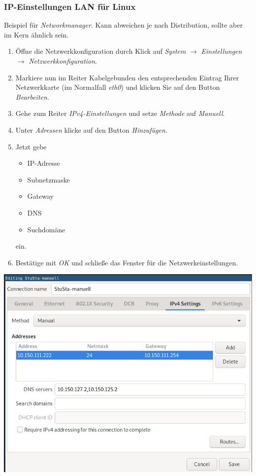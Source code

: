 \documentclass[a4paper,12pt]{scrartcl}
\begin{document}
\subsubsection*{IP-Einstellungen LAN für Linux}

Beispiel für \textit{Networkmanager}.
Kann abweichen je nach Distribution, sollte aber im Kern ähnlich sein.

\begin{minipage}{0.57\textwidth}
\begin{enumerate}
	\item Öffne die Netzwerkkonfiguration durch Klick auf \textit{System} $\rightarrow$ \textit{Einstellungen} $\rightarrow$ \textit{Netzwerkkonfiguration}.
	\item Markiere nun im Reiter Kabelgebunden den entsprechenden Eintrag Ihrer Netzwerkkarte (im Normalfall \textit{eth0}) und klicken Sie auf den Button \textit{Bearbeiten}.
	\item Gehe zum Reiter \textit{IPv4-Einstellungen} und setze \textit{Methode} auf \textit{Manuell}.
	\item Unter \textit{Adressen} klicke auf den Button \textit{Hinzufügen}.
	\item Jetzt gebe
	\begin{itemize}
		\item IP-Adresse
		\item Subnetzmaske
		\item Gateway
		\item DNS
		\item Suchdomäne
	\end{itemize}
	ein.
	\item Bestätige mit \textit{OK} und schließe das Fenster für die Netzwerkeinstellungen.
\end{enumerate}
\end{minipage}
\hfill
\begin{minipage}{0.4\textwidth}
\includegraphics[width=\linewidth]{Bilder/IP_Ubuntu_neu}
\end{minipage}
\end{document}
